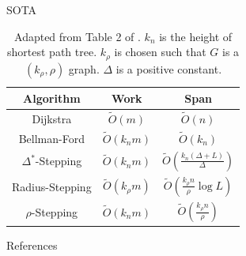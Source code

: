 \documentclass[aspectratio=169]{beamer}
\begin{document}
\begin{frame}{SOTA}
    \begin{table}
        \begin{tabular}{ccc}
            \hline
            \textbf{Algorithm}  & \textbf{Work}         & \textbf{Span}                                              \\
            \hline
            Dijkstra            & $\tilde{O}(m)$        & $\tilde{O}(n)$                                             \\
            Bellman-Ford        & $\tilde{O}(k_n m)$    & $\tilde{O}(k_n)$                                           \\
            $\Delta^*$-Stepping & $\tilde{O}(k_n m)$    & $\tilde{O} \left( \frac{k_n (\Delta + L)}{\Delta} \right)$ \\
            Radius-Stepping     & $\tilde{O}(k_\rho m)$ & $\tilde{O} \left( \frac{k_\rho n}{\rho} \log L \right)$    \\
            $\rho$-Stepping     & $\tilde{O}(k_n m)$    & $\tilde{O} \left( \frac{k_\rho n}{\rho} \right) $          \\
            \hline
        \end{tabular}
        \caption{
            Adapted from Table 2 of \textcite{dong21-07}.
            $k_n$ is the height of shortest path tree.
            $k_\rho$ is chosen such that $G$ is a $(k_\rho, \rho)$ graph.
            $\Delta$ is a positive constant.
        }
    \end{table}
\end{frame}

\begin{frame}[allowframebreaks]{References}
    \printbibliography
\end{frame}
\end{document}
